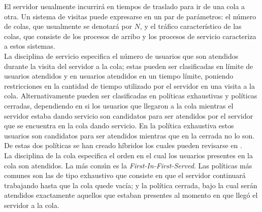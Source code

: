 \documentclass{article}
\numberwithin{equation}{section}
\begin{document}
El servidor usualmente incurrir\'a en tiempos de traslado para ir de una cola a otra. Un sistema de visitas puede expresarse en un par de par\'ametros: el n\'umero de colas, que usualmente se denotar\'a por $N$, y el tr\'afico caracter\'istico de las colas, que consiste de los procesos de arribo y los procesos de servicio caracteriza a estos sistemas.\\

La disciplina de servicio especifica el n\'umero de usuarios que son atendidos durante la visita del servidor a la cola; estas pueden ser clasificadas en l\'imite de usuarios atendidos y en usuarios atendidos en un tiempo l\'imite, poniendo restricciones en la cantidad de tiempo utilizado por el servidor en una visita a la cola. Alternativamente pueden ser clasificadas en pol\'iticas exhaustivas y pol\'iticas cerradas, dependiendo en si los usuarios que llegaron a la cola mientras el servidor estaba dando servicio son candidatos para ser atendidos por el servidor que se encuentra en la cola dando servicio. En la pol\'itica exhaustiva estos usuarios son candidatos para ser atendidos mientras que en la cerrada no lo son. De estas dos pol\'iticas se han creado h\'ibridos los cuales pueden revisarse en \cite{BoonMeiWinands}.\\

La disciplina de la cola especifica el orden en el cual los usuarios presentes en la cola son atendidos. La m\'as com\'un es la {\em First-In-First-Served}. Las pol\'iticas m\'as comunes son las de tipo exhaustivo que consiste en que el servidor continuar\'a trabajando hasta que la cola quede vac\'ia; y la pol\'itica cerrada, bajo la cual ser\'an atendidos exactamente aquellos que estaban presentes al momento en que lleg\'o el servidor a la cola. \\
\end{document}

